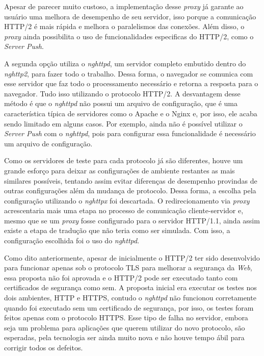 Apesar de parecer muito custoso, a implementação desse \textit{proxy} já garante ao usuário uma melhora de desempenho de seu servidor, isso porque a comunicação HTTP/2 é mais rápida e melhora o paralelismos das conexões. Além disso, o \textit{proxy} ainda possibilita o uso de funcionalidades especificas do HTTP/2, como o \textit{Server Push}.

A segunda opção utiliza o \textit{nghttpd}, um servidor completo embutido dentro do \textit{nghttp2}, para fazer todo o trabalho. Dessa forma, o navegador se comunica com esse servidor que faz todo o processamento necessário e retorna a resposta para o navegador. Tudo isso utilizando o protocolo HTTP/2. A desvantagem desse método é que o \textit{nghttpd} não possui um arquivo de configuração, que é uma característica típica de servidores como o Apache e o Nginx e, por isso, ele acaba sendo limitado em alguns casos. Por exemplo, ainda não é possível utilizar o \textit{Server Push} com o \textit{nghttpd}, pois para configurar essa funcionalidade é necessário um arquivo de configuração.

Como os servidores de teste para cada protocolo já são diferentes, houve um grande esforço para deixar as configurações de ambiente restantes as mais similares possíveis, tentando assim evitar diferenças de desempenho provindas de outras configurações além da mudança de protocolo. Dessa forma, a escolha pela configuração utilizando o \textit{nghttpx} foi descartada. O redirecionamento via \textit{proxy} acrescentaria mais uma etapa no processo de comunicação cliente-servidor e, mesmo que se um \textit{proxy} fosse configurado para o servidor HTTP/1.1, ainda assim existe a etapa de tradução que não teria como ser simulada. Com isso, a configuração escolhida foi o uso do \textit{nghttpd}.

Como dito anteriormente, apesar de inicialmente o HTTP/2 ter sido desenvolvido para funcionar apenas sob o protocolo TLS para melhorar a segurança da \textit{Web}, essa proposta não foi aprovada e o HTTP/2 pode ser executado tanto com certificados de segurança como sem. A proposta inicial era executar os testes nos dois ambientes, HTTP e HTTPS, contudo o \textit{nghttpd} não funcionou corretamente quando foi executado sem um certificado de segurança, por isso, os testes foram feitos apenas com o protocolo HTTPS. Esse tipo de falha no servidor, embora seja um problema para aplicações que querem utilizar do novo protocolo, são esperadas, pela tecnologia ser ainda muito nova e não houve tempo ábil para corrigir todos os defeitos.

